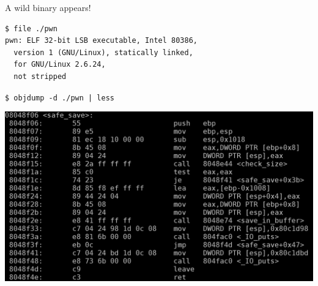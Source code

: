 \begin{frame}

  {\Huge A wild binary appears!}
  \vspace{1em}

  \begin{lstlisting}
$ file ./pwn
pwn: ELF 32-bit LSB executable, Intel 80386,
  version 1 (GNU/Linux), statically linked,
  for GNU/Linux 2.6.24,
  not stripped
  \end{lstlisting}

\end{frame}


\begin{frame}

  \huge
  \begin{center}
    \verb+$ objdump -d ./pwn | less+
  \end{center}
\end{frame}

{
\begin{frame}
  \begin{center}
    \includegraphics[width=\textwidth]{../images/objdump.png}
  \end{center}
\end{frame}
}


